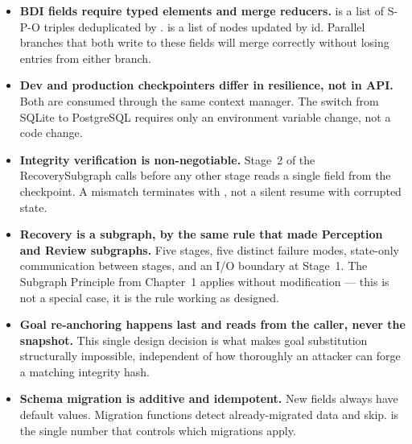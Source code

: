 \begin{takeawaybox}
\begin{itemize}
  \item \textbf{BDI fields require typed elements and merge reducers.}
         is a list of S-P-O  triples
        deduplicated by .
         is a list of  nodes updated by id.
        Parallel branches that both write to these fields will merge
        correctly without losing entries from either branch.

  \item \textbf{Dev and production checkpointers differ in resilience,
        not in API.}  Both are consumed through the same
         context manager.  The switch from
        SQLite to PostgreSQL requires only an environment variable
        change, not a code change.

  \item \textbf{Integrity verification is non-negotiable.}
        Stage~2 of the RecoverySubgraph calls 
        before any other stage reads a single field from the checkpoint.
        A mismatch terminates with ,
        not a silent resume with corrupted state.

  \item \textbf{Recovery is a subgraph, by the same rule that made
        Perception and Review subgraphs.}  Five stages, five distinct
        failure modes, state-only communication between stages, and an
        I/O boundary at Stage~1.  The Subgraph Principle from Chapter~1
        applies without modification --- this is not a special case,
        it is the rule working as designed.

  \item \textbf{Goal re-anchoring happens last and reads from the
        caller, never the snapshot.}  This single design decision is
        what makes goal substitution structurally impossible, independent
        of how thoroughly an attacker can forge a matching integrity hash.

  \item \textbf{Schema migration is additive and idempotent.}
        New fields always have default values.  Migration functions detect
        already-migrated data and skip.  
        is the single number that controls which migrations apply.
\end{itemize}
\end{takeawaybox}
